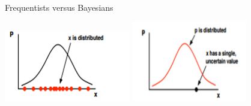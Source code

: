\documentclass{beamer}
\begin{document}
\begin{frame}{Frequentists versus Bayesians}
  \begin{center}
\includegraphics[width=5.5cm]{fig_freq.png}
\includegraphics[width=5cm]{fig_bayes.png}
\end{center}
  \vfill
{}  
\end{frame}
  
\end{document}
